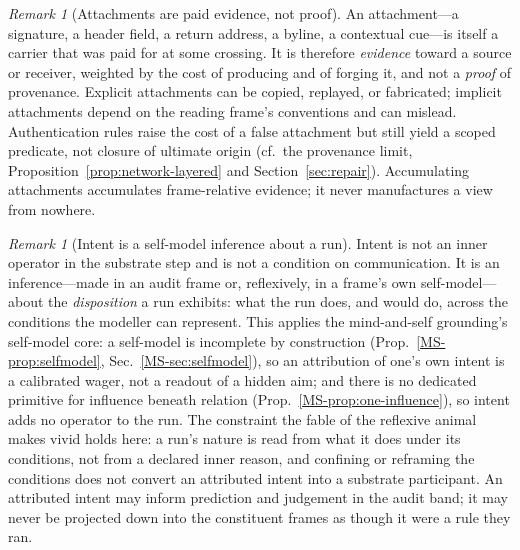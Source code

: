 \documentclass[11pt,a4paper]{article}
\theoremstyle{remark}\newtheorem{remark}[definition]{Remark}
\begin{document}
\begin{remark}[Attachments are paid evidence, not proof]\label{rem:attachments-evidence}
An attachment---a signature, a header field, a return address, a byline, a
contextual cue---is itself a carrier that was paid for at some crossing. It is
therefore \emph{evidence} toward a source or receiver, weighted by the cost of
producing and of forging it, and not a \emph{proof} of provenance. Explicit
attachments can be copied, replayed, or fabricated; implicit attachments depend on
the reading frame's conventions and can mislead. Authentication rules raise the
cost of a false attachment but still yield a scoped predicate, not closure of
ultimate origin (cf.\ the provenance limit, Proposition~\ref{prop:network-layered}
and Section~\ref{sec:repair}). Accumulating attachments accumulates frame-relative
evidence; it never manufactures a view from nowhere.
\end{remark}

\begin{remark}[Intent is a self-model inference about a run]\label{rem:intent-selfmodel}
Intent is not an inner operator in the substrate step and is not a condition on
communication. It is an inference---made in an audit frame or, reflexively, in a
frame's own self-model---about the \emph{disposition} a run exhibits: what the run
does, and would do, across the conditions the modeller can represent. This applies
the mind-and-self grounding's self-model core: a self-model is incomplete by
construction (Prop.~\ref{MS-prop:selfmodel}, Sec.~\ref{MS-sec:selfmodel}),
so an attribution of one's own intent is a calibrated wager, not a readout of a
hidden aim; and there is no dedicated primitive for influence beneath relation
(Prop.~\ref{MS-prop:one-influence}), so intent adds no operator to the
run. The constraint the fable of the reflexive animal makes vivid holds here: a
run's nature is read from what it does under its conditions, not from a declared
inner reason, and confining or reframing the conditions does not convert an
attributed intent into a substrate participant. An attributed intent may inform
prediction and judgement in the audit band; it may never be projected down into
the constituent frames as though it were a rule they ran.
\end{remark}
\end{document}
